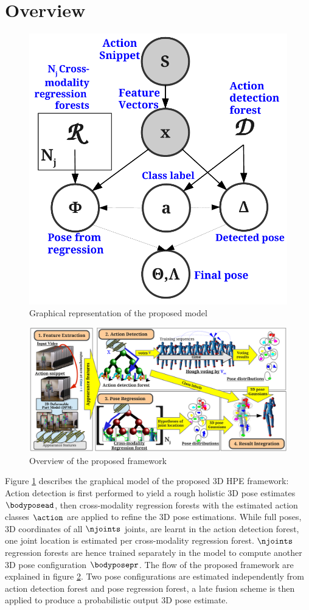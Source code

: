 \section{Overview}
\label{sec/body/method}

\begin{figure}[ht]
	\centering
	\includegraphics[width=0.35\linewidth]{fig/body/figure4.pdf}
	\caption{Graphical representation of the proposed model} 
	\label{fig/body/figure4gm}
\end{figure}

\begin{figure}[ht]
	\centering
	\includegraphics[width=1\linewidth]{fig/body/figure3_overview.pdf}
	\caption{Overview of the proposed framework}
	\label{fig/body/overview}
\end{figure} 


Figure \ref{fig/body/figure4gm} describes the graphical model of the proposed 3D HPE framework: Action detection is first performed to yield a rough holistic 3D pose estimates $\bodyposead$, then cross-modality regression forests with the estimated action classes $\action$ are applied to refine the 3D pose estimations. 
While full poses, \ie 3D coordinates of all $\njoints$ joints, are learnt in the action detection forest, one joint location is estimated per cross-modality regression forest. 
$\njoints$ regression forests are hence trained separately in the model to compute another 3D pose configuration $\bodyposepr$. 
The flow of the proposed framework are explained in figure \ref{fig/body/overview}. Two pose configurations are estimated independently from action detection forest and pose regression forest, a late fusion scheme is then applied to produce a probabilistic output 3D pose estimate.  

